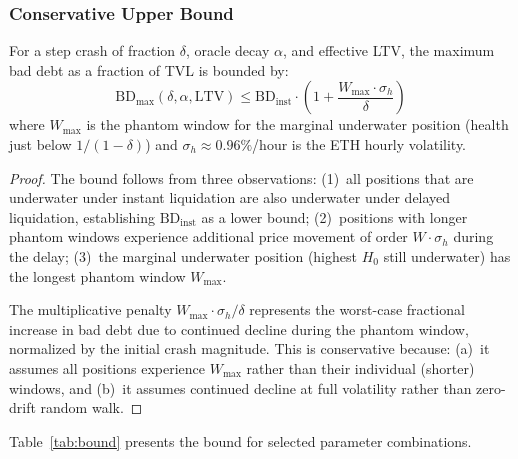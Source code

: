 \documentclass[10pt,a4paper,twocolumn]{article}
\begin{document}
\subsubsection{Conservative Upper Bound}
\label{subsec:bd-conservative}

\begin{theorem}
\label{thm:bd-bound}
For a step crash of fraction $\delta$, oracle decay $\alpha$, and effective LTV, the maximum bad debt as a fraction of TVL is bounded by:
\begin{equation}
\label{eq:bd-bound}
\text{BD}_{\max}(\delta, \alpha, \text{LTV}) \leq \text{BD}_{\text{inst}} \cdot \left(1 + \frac{W_{\max} \cdot \sigma_h}{\delta}\right)
\end{equation}
where $W_{\max}$ is the phantom window for the marginal underwater position (health just below $1/(1{-}\delta)$) and $\sigma_h \approx 0.96\%$/hour is the ETH hourly volatility.
\end{theorem}

\begin{proof}
The bound follows from three observations: (1)~all positions that are underwater under instant liquidation are also underwater under delayed liquidation, establishing $\text{BD}_{\text{inst}}$ as a lower bound; (2)~positions with longer phantom windows experience additional price movement of order $W \cdot \sigma_h$ during the delay; (3)~the marginal underwater position (highest $H_0$ still underwater) has the longest phantom window $W_{\max}$.

The multiplicative penalty $W_{\max} \cdot \sigma_h / \delta$ represents the worst-case fractional increase in bad debt due to continued decline during the phantom window, normalized by the initial crash magnitude. This is conservative because: (a)~it assumes all positions experience $W_{\max}$ rather than their individual (shorter) windows, and (b)~it assumes continued decline at full volatility rather than zero-drift random walk.
\end{proof}

Table~\ref{tab:bound} presents the bound for selected parameter combinations.
\end{document}
